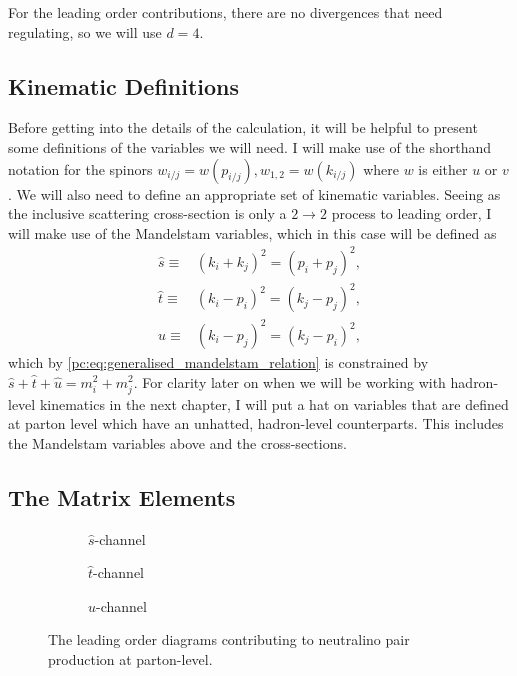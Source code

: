 \documentclass[../main.tex]{subfiles}
\begin{document}
For the leading order contributions, there are no divergences that need regulating, so we will use \(d=4\).

\subsection{Kinematic Definitions}
Before getting into the details of the calculation, it will be helpful to present some definitions of the variables we will need.
I will make use of the shorthand notation for the spinors \(w_{i/j} = w(p_{i/j}), w_{1,2} = w(k_{i/j})\) where \(w\) is either \(u\) or \(v\).
We will also need to define an appropriate set of kinematic variables.
Seeing as the inclusive scattering cross-section is only a \(2 \to 2\) process to leading order, I will make use of the Mandelstam variables, which in this case will be defined as
\begin{subequations}
  \label{pc:eq:mandelstam_LO}
  \begin{align}
    \hat{s} \equiv & (k_i+k_j)^2 = (p_i+p_j)^2, \\
    \hat{t} \equiv & (k_i-p_i)^2 = (k_j-p_j)^2, \\
    \hat{u} \equiv & (k_i-p_j)^2 = (k_j-p_i)^2,
  \end{align}
\end{subequations}
which by \cref{pc:eq:generalised_mandelstam_relation} is constrained by \(\hat{s} + \hat{t} + \hat{u} = m_i^2 + m_j^2\).
For clarity later on when we will be working with hadron-level kinematics in the next chapter, I will put a hat on variables that are defined at parton level which have an unhatted, hadron-level counterparts.
This includes the Mandelstam variables above and the cross-sections.


\subsection{The Matrix Elements}
\begin{figure} [ht!]
  \centering
  \begin{subfigure}{0.3\linewidth}
    \centering
    \caption{\(\hat{s}\)-channel}
    \label{pc:subfig:tree_level_s-channel}
  \end{subfigure}
  \begin{subfigure}{0.3\linewidth}
    \centering
    \caption{\(\hat{t}\)-channel}
  \end{subfigure}
  \begin{subfigure}{0.3\linewidth}
    \centering
    \caption{\(\hat{u}\)-channel}
  \end{subfigure}
  \caption{The leading order diagrams contributing to neutralino pair
    production at parton-level.}
  \label{pc:fig:tree_level_diagrams}
\end{figure}
\end{document}
